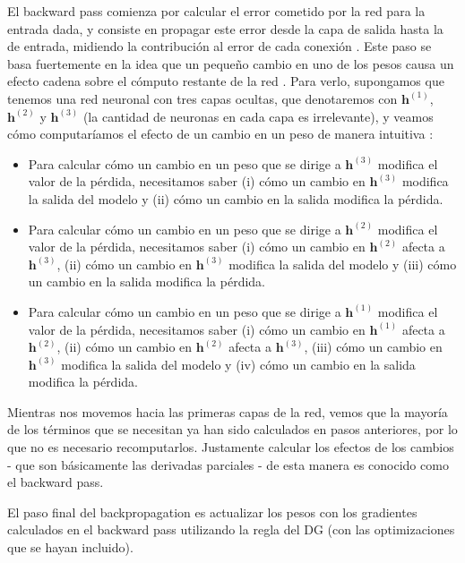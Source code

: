 \documentclass[../../main.tex]{subfiles}
\begin{document}
El backward pass comienza por calcular el error cometido por la red para la entrada dada,
y consiste en propagar este error desde la capa de salida hasta la de entrada, midiendo la
contribución al error de cada conexión \cite{hands-on-ML-sklearn-tf}. Este paso se basa
fuertemente en la idea que un pequeño cambio en uno de los pesos causa un efecto cadena
sobre el cómputo restante de la red \cite{prince2024understanding}. Para verlo, supongamos
que tenemos una red neuronal con tres capas ocultas, que denotaremos con \(\bm{h}^{(1)}\),
\(\bm{h}^{(2)}\) y \(\bm{h}^{(3)}\) (la cantidad de neuronas en cada capa es irrelevante),
y veamos cómo computaríamos el efecto de un cambio en un peso de manera intuitiva
\cite{prince2024understanding}:
\begin{itemize}
    \item Para calcular cómo un cambio en un peso que se dirige a \(\bm{h}^{(3)}\)
    modifica el valor de la pérdida, necesitamos saber (i) cómo un cambio en
    \(\bm{h}^{(3)}\) modifica la salida del modelo y (ii) cómo un cambio en la salida
    modifica la pérdida.
    \item Para calcular cómo un cambio en un peso que se dirige a \(\bm{h}^{(2)}\)
    modifica el valor de la pérdida, necesitamos saber (i) cómo un cambio en
    \(\bm{h}^{(2)}\) afecta a \(\bm{h}^{(3)}\), (ii) cómo un cambio en \(\bm{h}^{(3)}\)
    modifica la salida del modelo y (iii) cómo un cambio en la salida modifica la pérdida.
    \item Para calcular cómo un cambio en un peso que se dirige a \(\bm{h}^{(1)}\)
    modifica el valor de la pérdida, necesitamos saber (i) cómo un cambio en
    \(\bm{h}^{(1)}\) afecta a \(\bm{h}^{(2)}\), (ii) cómo un cambio en \(\bm{h}^{(2)}\)
    afecta a \(\bm{h}^{(3)}\), (iii) cómo un cambio en \(\bm{h}^{(3)}\) modifica la salida
    del modelo y (iv) cómo un cambio en la salida modifica la pérdida.
\end{itemize}
Mientras nos movemos hacia las primeras capas de la red, vemos que la mayoría de los
términos que se necesitan ya han sido calculados en pasos anteriores, por lo que no es
necesario recomputarlos. Justamente calcular los efectos de los cambios - que son
básicamente las derivadas parciales - de esta manera es conocido como el backward pass.

El paso final del backpropagation es actualizar los pesos con los gradientes calculados
en el backward pass utilizando la regla del DG (con las optimizaciones que se hayan
incluido).
\end{document}
